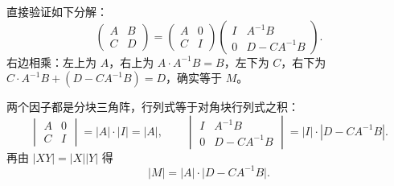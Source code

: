 直接验证如下分解：
\[
\begin{pmatrix}A&B\\C&D\end{pmatrix}
=
\begin{pmatrix}A&0\\C&I\end{pmatrix}
\begin{pmatrix}I&A^{-1}B\\0&D-CA^{-1}B\end{pmatrix}.
\]
右边相乘：左上为 \(A\)，右上为 \(A\cdot A^{-1}B=B\)，左下为 \(C\)，右下为 \(C\cdot A^{-1}B+(D-CA^{-1}B)=D\)，确实等于 \(M\)。

两个因子都是分块三角阵，行列式等于对角块行列式之积：
\[
\begin{vmatrix}A&0\\C&I\end{vmatrix}=|A|\cdot|I|=|A|,\qquad
\begin{vmatrix}I&A^{-1}B\\0&D-CA^{-1}B\end{vmatrix}=|I|\cdot|D-CA^{-1}B|.
\]
再由 \(|XY|=|X||Y|\) 得
\[
|M|=|A|\cdot\bigl|D-CA^{-1}B\bigr|.
\]


